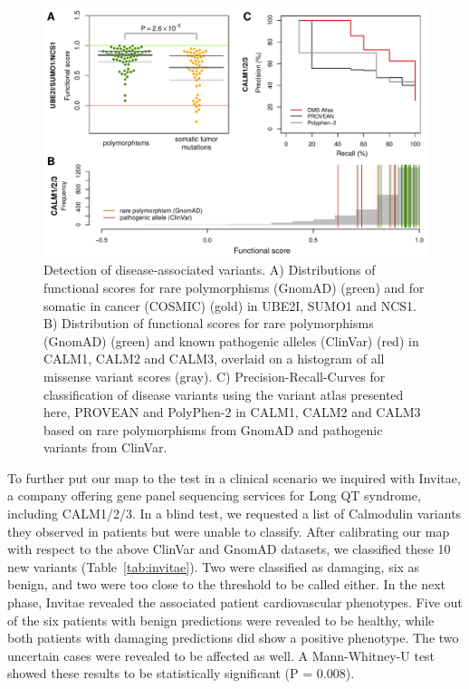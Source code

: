 \begin{figure}[h!]
	\centering
	\includegraphics[width=\textwidth]{img/calm_disease.pdf}
	\caption{Detection of disease-associated variants. A) Distributions of functional scores for rare polymorphisms (GnomAD) (green) and for somatic in cancer (COSMIC) (gold) in UBE2I, SUMO1 and NCS1. B) Distribution of functional scores for rare polymorphisms (GnomAD) (green) and known pathogenic alleles (ClinVar) (red) in CALM1, CALM2 and CALM3, overlaid on a histogram of all missense variant scores (gray). C) Precision-Recall-Curves for classification of disease variants using the variant atlas presented here, PROVEAN and PolyPhen-2 in CALM1, CALM2 and CALM3 based on rare polymorphisms from GnomAD and pathogenic variants from ClinVar.}
	\label{fig:calm_disease}
\end{figure}


To further put our map to the test in a clinical scenario we inquired with Invitae, a company offering gene panel sequencing services for Long QT syndrome, including CALM1/2/3. In a blind test, we requested a list of Calmodulin variants they observed in patients but were unable to classify. After calibrating our map with respect to the above ClinVar and GnomAD datasets, we classified these 10 new variants (Table~\ref{tab:invitae}). Two were classified as damaging, six as benign, and two were too close to the threshold to be called either. In the next phase, Invitae revealed the associated patient cardiovascular phenotypes. Five out of the six patients with benign predictions were revealed to be healthy, while both patients with damaging predictions did show a positive phenotype. The two uncertain cases were revealed to be affected as well. A Mann-Whitney-U test showed these results to be statistically significant (P = 0.008).

